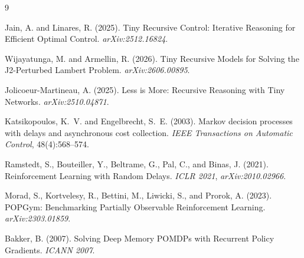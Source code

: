 \documentclass[11pt]{article}
\begin{document}

\begin{thebibliography}{9}

Jain, A. and Linares, R. (2025).
\newblock Tiny Recursive Control: Iterative Reasoning for Efficient Optimal Control.
\newblock \emph{arXiv:2512.16824}.

Wijayatunga, M. and Armellin, R. (2026).
\newblock Tiny Recursive Models for Solving the J2-Perturbed Lambert Problem.
\newblock \emph{arXiv:2606.00895}.

Jolicoeur-Martineau, A. (2025).
\newblock Less is More: Recursive Reasoning with Tiny Networks.
\newblock \emph{arXiv:2510.04871}.

Katsikopoulos, K.~V. and Engelbrecht, S.~E. (2003).
\newblock Markov decision processes with delays and asynchronous cost collection.
\newblock \emph{IEEE Transactions on Automatic Control}, 48(4):568--574.

Ramstedt, S., Bouteiller, Y., Beltrame, G., Pal, C., and Binas, J. (2021).
\newblock Reinforcement Learning with Random Delays.
\newblock \emph{ICLR 2021}, \emph{arXiv:2010.02966}.

Morad, S., Kortvelesy, R., Bettini, M., Liwicki, S., and Prorok, A. (2023).
\newblock POPGym: Benchmarking Partially Observable Reinforcement Learning.
\newblock \emph{arXiv:2303.01859}.

Bakker, B. (2007).
\newblock Solving Deep Memory POMDPs with Recurrent Policy Gradients.
\newblock \emph{ICANN 2007}.

\end{thebibliography}
\end{document}

